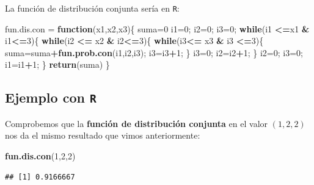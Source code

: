 \documentclass[]{book}
\newenvironment{Shaded}{\begin{snugshade}}{\end{snugshade}}
\newcommand{\ControlFlowTok}[1]{\textcolor[rgb]{0.13,0.29,0.53}{\textbf{#1}}}
\newcommand{\DecValTok}[1]{\textcolor[rgb]{0.00,0.00,0.81}{#1}}
\newcommand{\KeywordTok}[1]{\textcolor[rgb]{0.13,0.29,0.53}{\textbf{#1}}}
\newcommand{\NormalTok}[1]{#1}
\newcommand{\OperatorTok}[1]{\textcolor[rgb]{0.81,0.36,0.00}{\textbf{#1}}}
\newcommand{\StringTok}[1]{\textcolor[rgb]{0.31,0.60,0.02}{#1}}
\begin{document}
La función de distribución conjunta sería en \texttt{R}:

\begin{Shaded}
\begin{Highlighting}[]
\NormalTok{fun.dis.con =}\StringTok{ }\ControlFlowTok{function}\NormalTok{(x1,x2,x3)\{}
\NormalTok{  suma=}\DecValTok{0}
\NormalTok{  i1=}\DecValTok{0}\NormalTok{; i2=}\DecValTok{0}\NormalTok{; i3=}\DecValTok{0}\NormalTok{;}
  \ControlFlowTok{while}\NormalTok{(i1 }\OperatorTok{<=}\NormalTok{x1 }\OperatorTok{&}\StringTok{ }\NormalTok{i1}\OperatorTok{<=}\DecValTok{3}\NormalTok{)\{}
    \ControlFlowTok{while}\NormalTok{(i2 }\OperatorTok{<=}\StringTok{ }\NormalTok{x2 }\OperatorTok{&}\StringTok{ }\NormalTok{i2}\OperatorTok{<=}\DecValTok{3}\NormalTok{)\{}
      \ControlFlowTok{while}\NormalTok{(i3}\OperatorTok{<=}\StringTok{ }\NormalTok{x3 }\OperatorTok{&}\StringTok{ }\NormalTok{i3 }\OperatorTok{<=}\DecValTok{3}\NormalTok{)\{}
\NormalTok{        suma=suma}\OperatorTok{+}\KeywordTok{fun.prob.con}\NormalTok{(i1,i2,i3); i3=i3}\OperatorTok{+}\DecValTok{1}\NormalTok{;}
\NormalTok{      \}}
\NormalTok{      i3=}\DecValTok{0}\NormalTok{; i2=i2}\OperatorTok{+}\DecValTok{1}\NormalTok{;}
\NormalTok{    \}}
\NormalTok{    i2=}\DecValTok{0}\NormalTok{; i3=}\DecValTok{0}\NormalTok{; i1=i1}\OperatorTok{+}\DecValTok{1}\NormalTok{;}
\NormalTok{  \}}
  \KeywordTok{return}\NormalTok{(suma)}
\NormalTok{\}}
\end{Highlighting}
\end{Shaded}

\hypertarget{ejemplo-con-r-17}{%
\subsection{\texorpdfstring{Ejemplo con \texttt{R}}{Ejemplo con R}}\label{ejemplo-con-r-17}}

Comprobemos que la \textbf{función de distribución conjunta} en el valor \((1,2,2)\) nos da el mismo resultado que vimos anteriormente:

\begin{Shaded}
\begin{Highlighting}[]
\KeywordTok{fun.dis.con}\NormalTok{(}\DecValTok{1}\NormalTok{,}\DecValTok{2}\NormalTok{,}\DecValTok{2}\NormalTok{)}
\end{Highlighting}
\end{Shaded}

\begin{verbatim}
## [1] 0.9166667
\end{verbatim}
\end{document}
